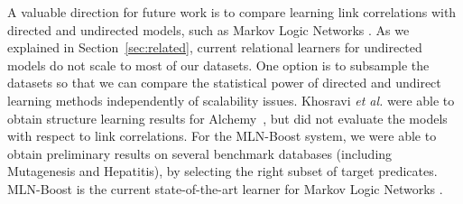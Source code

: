 \documentclass{article}
\begin{document}
A valuable direction for future work is to compare learning link correlations with directed and undirected models, such as Markov Logic Networks \cite{Domingos2009}. As we explained in Section~\ref{sec:related}, current relational learners for undirected models do not scale to most of our datasets. One option is to subsample the datasets so that we can compare the statistical power of directed and undirect learning methods
independently of scalability issues. Khosravi {\em et al.} were able to obtain structure learning results for Alchemy~\cite{Khosravi2010}, but did not evaluate the models with respect to link correlations. For the MLN-Boost system, we were able to obtain preliminary results on several benchmark databases  (including Mutagenesis and Hepatitis), by selecting the right subset of target predicates. MLN-Boost is the current state-of-the-art learner for Markov Logic Networks \cite{Khot2011}.


\end{document}
